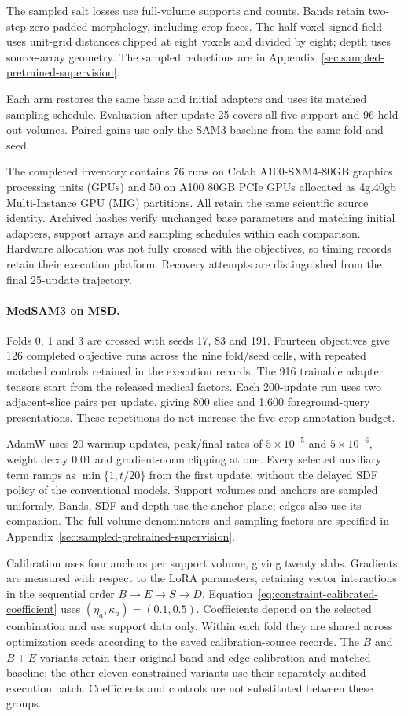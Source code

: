 \documentclass[12pt,a4paper]{article}
\begin{document}
The sampled salt losses use full-volume supports and counts. Bands
retain two-step zero-padded morphology, including crop faces.
The half-voxel signed field uses unit-grid distances clipped at eight
voxels and divided by eight; depth uses source-array geometry.
The sampled reductions are in
Appendix~\ref{sec:sampled-pretrained-supervision}.

Each arm restores the same base and initial adapters and uses its
matched sampling schedule. Evaluation after update 25 covers all five
support and 96 held-out volumes. Paired gains use only the SAM3
baseline from the same fold and seed.

The completed inventory contains 76 runs on Colab A100-SXM4-80GB
graphics processing units (GPUs) and 50 on A100 80GB PCIe GPUs allocated
as 4g.40gb Multi-Instance GPU (MIG) partitions. All retain the same
scientific source identity. Archived hashes verify unchanged base
parameters and matching initial adapters, support arrays and sampling
schedules within each comparison. Hardware allocation was not fully
crossed with the objectives, so timing records retain their execution
platform. Recovery attempts are distinguished from the final
25-update trajectory.

\paragraph{MedSAM3 on MSD.}\label{sec:medsam-methods-details}
Folds 0, 1 and 3 are crossed with seeds 17, 83 and 191. Fourteen
objectives give 126 completed objective runs across the
nine fold/seed cells, with repeated matched controls retained in the
execution records. The 916 trainable adapter tensors start from the
released medical factors. Each 200-update run uses two adjacent-slice pairs per update,
giving 800 slice and 1,600 foreground-query presentations. These
repetitions do not increase the five-crop annotation budget.

AdamW uses 20 warmup updates, peak/final rates of $5\times10^{-5}$
and $5\times10^{-6}$, weight decay 0.01 and gradient-norm clipping
at one. Every selected auxiliary term ramps as $\min\{1,t/20\}$
from the first update, without the delayed SDF policy of the conventional
models. Support volumes and anchors are sampled uniformly. Bands,
SDF and depth use the anchor plane; edges also use its companion.
The full-volume denominators and sampling factors are specified in
Appendix~\ref{sec:sampled-pretrained-supervision}.

Calibration uses four anchors per support volume, giving twenty
slabs. Gradients are measured with respect to the LoRA parameters,
retaining vector interactions in the sequential order
$B\to E\to S\to D$. Equation~\ref{eq:constraint-calibrated-coefficient}
uses $(\eta_a,\kappa_a)=(0.1,0.5)$. Coefficients depend on the selected
combination and use support data only. Within each fold they are shared
across optimization seeds according to the saved calibration-source
records. The $B$ and $B+E$ variants retain their original band and edge
calibration and matched baseline; the other eleven constrained variants
use their separately audited execution batch. Coefficients and controls
are not substituted between these groups.
\end{document}
